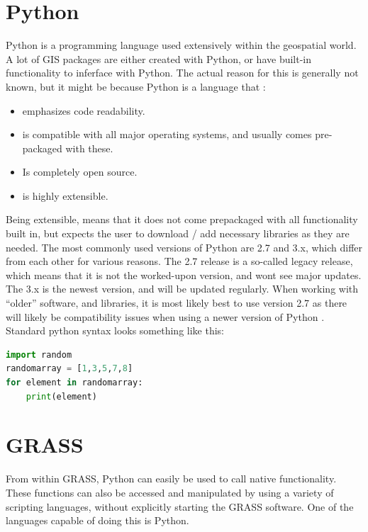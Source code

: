 
\section{Python}\label{sec:issues}

Python is a programming language used extensively within the geospatial world. A lot of GIS packages are either created with Python, or have built-in functionality to inferface with Python. The actual reason for this is generally not known, but it might be because Python is a language that \citep{pybook}:
\begin{itemize}
\item emphasizes code readability.
\item is compatible with all major operating systems, and usually comes pre-packaged with these. 
\item Is completely open source. 
\item is highly extensible. 
\end{itemize}
Being extensible, means that it does not come prepackaged with all functionality built in, but expects the user to download / add necessary libraries as they are needed. 
The most commonly used versions of Python are 2.7 and 3.x, which differ from each other for various reasons. The 2.7 release is a so-called legacy release, which means that it is not the worked-upon version, and wont see major updates. The 3.x is the newest version, and will be updated regularly. When working with “older” software, and libraries, it is most likely best to use version 2.7 as there will likely be compatibility issues when using a newer version of Python \citep{python}.\\

Standard python syntax looks something like this:\\

\begin{lstlisting}[language=Python]
import random
randomarray = [1,3,5,7,8]
for element in randomarray:
	print(element)
\end{lstlisting}

\section{GRASS}

From within GRASS, Python can easily be used to call native functionality. These functions can also be accessed and manipulated by using a variety of scripting languages, without explicitly starting the GRASS software. One of the languages capable of doing this is Python. \citep{grassbook} \\


